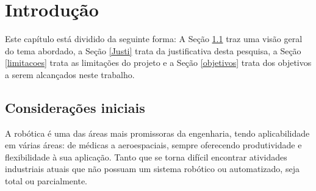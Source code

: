 \vspace{-1cm}
\chapter{Introdução} \label{cap:Introducao}

\vspace{-1.5cm} %
Este capítulo está dividido da seguinte forma: A Seção \ref{Consideracoes_iniciais} traz uma visão geral do tema abordado, 
a Seção \ref{Justi} trata da justificativa desta pesquisa, a Seção \ref{limitacoes} trata as limitações do 
projeto e a Seção \ref{objetivos} trata dos objetivos a serem alcançados neste trabalho. 

\begin{spacing}{2}\end{spacing} %
\section{Considerações iniciais} \label{Consideracoes_iniciais}    


\begin{comment}
A robótica é uma das áreas mais promissoras da engenharia, tendo aplicabilidade em várias áreas da indústria, de médicas a 
aeroespaciais, sempre oferecendo produtividade e flexibilidade à sua aplicação. 
Tanto que se torna difícil encontrar atividades industriais atuais que não possuam um sistema robótico ou 
automatizado, seja totalmente ou parcialmente.\par
\end{comment}

A robótica é uma das áreas mais promissoras da engenharia, tendo aplicabilidade em várias áreas: de médicas a 
aeroespaciais, sempre oferecendo produtividade e flexibilidade à sua aplicação. 
Tanto que se torna difícil encontrar atividades industriais atuais que não possuam um sistema robótico ou 
automatizado, seja total ou parcialmente.\par

\begin{comment}
 A robótica é uma das áreas mais promissoras da engenharia, tendo aplicabilidade em várias áreas da indústria: de médicas a 
aeroespaciais, sempre oferecendo produtividade e flexibilidade à sua aplicação. 
Tanto que se torna difícil encontrar atividades industriais atuais que não possuam um sistema robótico ou 
automatizado, seja totalmente ou parcialmente.\par
\end{comment}


